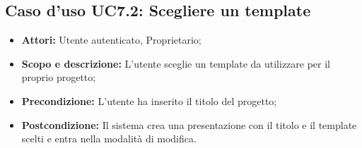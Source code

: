 \subsection{Caso d'uso UC7.2: Scegliere un template}
\begin{itemize}
	\item \textbf{Attori:} Utente autenticato, Proprietario;
	\item \textbf{Scopo e descrizione:} L'utente sceglie un \gls{template} da utilizzare per il proprio progetto;
	\item \textbf{Precondizione:} L'utente ha inserito il titolo del progetto;
	\item \textbf{Postcondizione:} Il sistema crea una presentazione con il titolo e il \gls{template} scelti e entra nella modalità di modifica.
\end{itemize}

